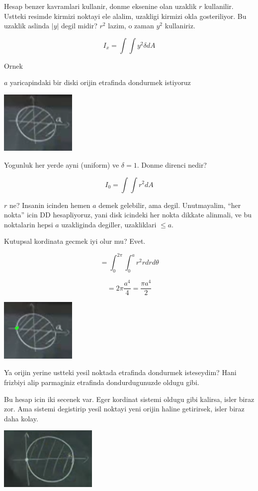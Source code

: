 \documentclass[12pt,fleqn]{article}
\begin{document}
Hesap benzer kavramlari kullanir, donme eksenine olan uzaklik $r$
kullanilir. Ustteki resimde kirmizi noktayi ele alalim, uzakligi kirmizi
okla gosteriliyor. Bu uzaklik aslinda $|y|$ degil midir? $r^2$ lazim, o
zaman $y^2$ kullaniriz. 

\[ I_x = \int \int y^2 \delta dA \]

Ornek

$a$ yaricapindaki bir diski orijin etrafinda dondurmek istiyoruz 

\includegraphics[height=3cm]{17_7.png}

Yogunluk her yerde ayni (uniform) ve $\delta = 1$. Donme direnci nedir? 

\[ I_0 = \int \int r^2 dA \]

$r$ ne? Insanin icinden hemen $a$ demek gelebilir, ama degil. Unutmayalim,
``her nokta'' icin DD hesapliyoruz, yani disk icindeki her nokta dikkate
alinmali, ve bu noktalarin hepsi $a$ uzakliginda degiller, uzakliklari $\le
a$. 

Kutupsal kordinata gecmek iyi olur mu? Evet. 

\[ = \int_0^{2\pi} \int_0^a r^2 r dr d\theta \]


\[ = 2\pi \frac{a^4}{4} = \frac{\pi a^4}{2} \]

\includegraphics[height=3cm]{17_8.png}

Ya orijin yerine ustteki yesil noktada etrafinda dondurmek isteseydim? Hani
frizbiyi alip parmaginiz etrafinda dondurdugunuzde oldugu gibi. 

Bu hesap icin iki secenek var. Eger kordinat sistemi oldugu gibi kalirsa,
isler biraz zor. Ama sistemi degistirip yesil noktayi yeni orijin haline
getirirsek, isler biraz daha kolay. 

\includegraphics[height=3cm]{17_9.png}
\end{document}

